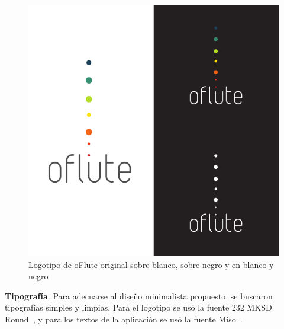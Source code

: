 \begin{figure}[htp!]
  \centering
  \includegraphics[width=\textwidth]{5_diseno/imagen_composite}
  \caption{Logotipo de oFlute original sobre blanco, sobre negro y en blanco y
    negro}
\end{figure}

\textbf{Tipografía}. Para adecuarse al diseño minimalista propuesto, se buscaron
tipografías simples y limpias. Para el logotipo se usó la fuente 232 MKSD
Round~\cite{fuentelogo}, y para los textos de la aplicación se usó la fuente
Miso~\cite{fuentetexto}.

